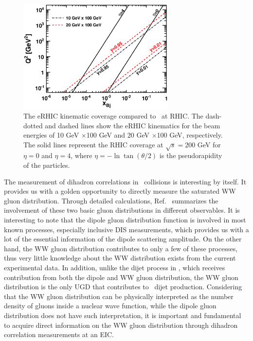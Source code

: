 \begin{figure}[hbt] 
\begin{center}
\includegraphics[width=0.7\textwidth]{plots/chpt6/eAvsdA_kinematics.eps} 
\end{center} 
\caption[The kinematic coverage of eRHIC compared with RHIC in the $Q^{2}-x$ plane]
{The eRHIC kinematic coverage compared to \pA\ at RHIC. The dash-dotted and dashed
lines show the eRHIC kinematics for the beam energies of 10 GeV
$\times$100 GeV and 20 GeV $\times$100 GeV, respectively. The solid lines 
represent the RHIC coverage at $\sqrt{s}=200$ GeV for $\eta=0$ and $\eta=4$, where
$\eta=-\ln\tan(\theta/2)$ is the pseudorapidity of the particles.
\label{fig:eAvspA_kinematics}}
\end{figure}

The measurement of dihadron correlations in \eA\ collisions is
interesting by itself. It provides us with a golden opportunity to directly
measure the saturated WW gluon distribution. Through detailed calculations,
Ref.~\cite{Dominguez:2011wm} summarizes the involvement of these two basic
gluon distributions in different observables. It is interesting
to note that the dipole gluon distribution function is involved in most
known processes, especially inclusive DIS measurements, which provides us with a
lot of the essential information of the dipole scattering amplitude. On the
other hand, the WW gluon distribution contributes to only a few of these
processes, thus very little knowledge about the WW distribution exists from
the current experimental data. In addition, unlike the dijet process in \pA,
which receives contribution from both the dipole and WW gluon distribution, the WW gluon
distribution is the only UGD that contributes to \eA\ dijet production. Considering
that the WW gluon distribution can be physically interpreted as the number density
of gluons inside a nuclear wave function, while the dipole gluon distribution
does not have such interpretation, it is important and fundamental to
acquire direct information on the WW gluon distribution through dihadron
correlation measurements at an EIC.




